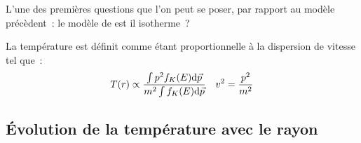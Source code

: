 L'une des premières questions que l'on peut se poser, par rapport au modèle précèdent~: le modèle de \King est il isotherme~?


La température est définit comme étant proportionnelle à la dispersion de vitesse tel que~:
\begin{align}
	T(r) &\propto \dfrac{\int p^2 f_K(E) \mathrm{d}\vec{p}}{m^2 \int f_K(E) \mathrm{d}\vec{p}} & v^2 = \frac{p^2}{m^2}
\end{align}

\subsection{Évolution de la température avec le rayon}

